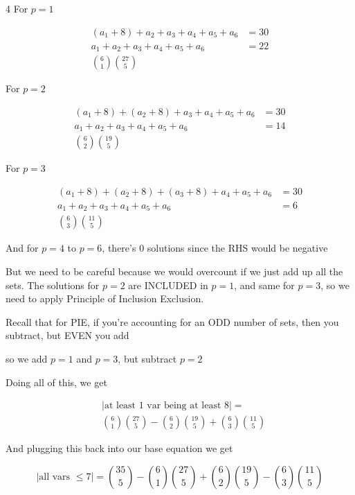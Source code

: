 \documentclass[10pt,landscape]{article}
\begin{document}
\begin{multicols}{4}
For $p = 1$

\begin{align*}
    (a_1 + 8) + a_2 + a_3 + a_4 + a_5 + a_6 &= 30 \\
    a_1 + a_2 + a_3 + a_4 + a_5 + a_6 &= 22 \\
    {6 \choose 1}{27 \choose 5} &
\end{align*}

For $p = 2$

\begin{align*}
    (a_1 + 8) + (a_2 + 8) + a_3 + a_4 + a_5 + a_6 &= 30 \\
    a_1 + a_2 + a_3 + a_4 + a_5 + a_6 &= 14 \\
    {6 \choose 2}{19 \choose 5} &
\end{align*}

For $p = 3$

\begin{align*}
    (a_1 + 8) + (a_2 + 8) + (a_3 + 8) + a_4 + a_5 + a_6 &= 30 \\
    a_1 + a_2 + a_3 + a_4 + a_5 + a_6 &= 6 \\
    {6 \choose 3}{11 \choose 5} &
\end{align*}

And for $p = 4$ to $p = 6$, there's 0 solutions since the RHS would be negative

But we need to be careful because we would overcount if we just add up all the sets. The solutions for $p = 2$ are INCLUDED in $p = 1$, and same for
$p = 3$, so we need to apply Principle of Inclusion Exclusion. 

Recall that for PIE, if you're accounting for an ODD number of sets, then you subtract, but EVEN you add

so we add $p = 1$ and $p = 3$, but subtract $p = 2$

Doing all of this, we get

\begin{align*}
    &|\text{at least 1 var being at least 8}| = \\
    &{6 \choose 1}{27 \choose 5} - {6 \choose 2}{19 \choose 5} + {6 \choose 3}{11 \choose 5}
\end{align*}

And plugging this back into our base equation we get

$$| \text{all vars } \leq 7 | = \boxed{{35 \choose 5} - {6 \choose 1}{27 \choose 5} + {6 \choose 2}{19 \choose 5} - {6 \choose 3}{11 \choose 5}}$$

\end{multicols}
\end{document}
